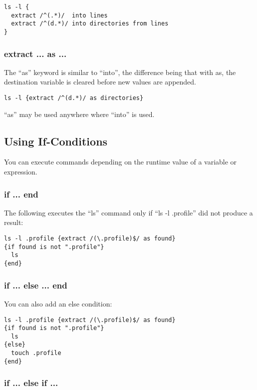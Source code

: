 \begin{lstlisting}
ls -l {
  extract /^(.*)/  into lines
  extract /^(d.*)/ into directories from lines
}
\end{lstlisting}


\subsubsection{extract ... as ...}

The ``as'' keyword is similar to ``into'', the difference being that with 
as, the destination variable is cleared before new values are appended. 

\begin{lstlisting}
ls -l {extract /^(d.*)/ as directories}
\end{lstlisting}

``as'' may be used anywhere where ``into'' is used.


\subsection{Using If-Conditions}

You can execute commands depending on the runtime value of a variable or 
expression. 

\subsubsection{if ... end}

The following \product executes the ``ls'' command only if ``ls -l .profile'' 
did not produce a result: 

\begin{lstlisting}
ls -l .profile {extract /(\.profile)$/ as found}
{if found is not ".profile"}
  ls
{end}
\end{lstlisting}


\subsubsection{if ... else ... end}

You can also add an else condition: 

\begin{lstlisting}
ls -l .profile {extract /(\.profile)$/ as found}
{if found is not ".profile"}
  ls
{else}
  touch .profile
{end}
\end{lstlisting}


\subsubsection{if ... else if ...}

